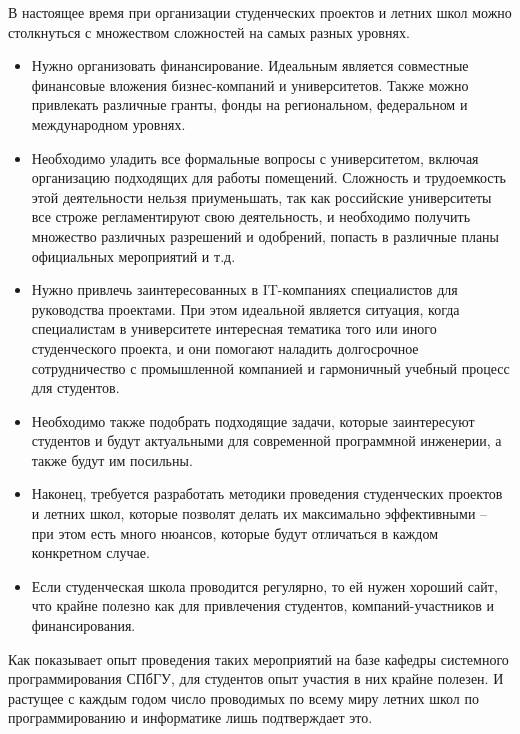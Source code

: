 \documentclass[a5paper]{article}
\begin{document}
В настоящее время при организации студенческих проектов и летних школ можно столкнуться с множеством сложностей на самых разных уровнях. 

\begin{itemize}
 \item Нужно организовать финансирование. Идеальным является совместные финансовые вложения бизнес-компаний и университетов. Также можно привлекать различные гранты, фонды на региональном, федеральном и международном уровнях. 
 \item Необходимо уладить все формальные вопросы с университетом, включая организацию подходящих для работы помещений. Сложность и трудоемкость этой деятельности нельзя приуменьшать, так как российские университеты все строже регламентируют свою деятельность, и необходимо получить множество различных разрешений и одобрений, попасть в различные планы официальных мероприятий и т.д. 
 \item Нужно привлечь заинтересованных в IT-компаниях специалистов для руководства проектами. При  этом идеальной является ситуация, когда специалистам в университете интересная  тематика того или иного студенческого проекта, и они помогают наладить долгосрочное сотрудничество с промышленной компанией и гармоничный учебный процесс для студентов.  
 \item Необходимо также подобрать подходящие задачи, которые заинтересуют студентов и будут актуальными для современной программной инженерии, а также будут им посильны. 
 \item Наконец,  требуется разработать методики проведения студенческих проектов и летних школ, которые позволят делать их максимально эффективными – при этом есть много нюансов, которые будут отличаться в каждом конкретном случае.  
 \item Если студенческая школа проводится регулярно, то ей нужен хороший сайт, что крайне полезно как для привлечения студентов, компаний-участников и финансирования. 
\end{itemize}
  
Как показывает опыт проведения таких мероприятий на базе кафедры системного программирования СПбГУ, для студентов опыт участия в них крайне полезен. И растущее с каждым годом число проводимых по всему миру летних школ по программированию и информатике лишь подтверждает это.
\end{document}
